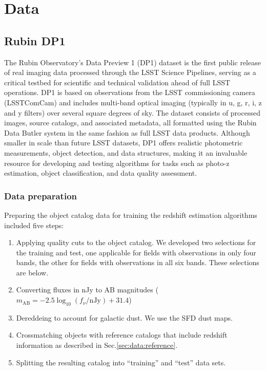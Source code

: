\section{Data}
\label{sec:data:0}

\subsection{Rubin DP1}
\label{sec:data:dp1}

The Rubin Observatory’s Data Preview 1 (DP1) dataset is the first public release of real imaging data processed through the LSST Science Pipelines, serving as a critical testbed for scientific and technical validation ahead of full LSST operations.  DP1 is based on observations from the LSST commissioning camera (LSSTComCam) and includes multi-band optical imaging (typically in u, g, r, i, z and y filters) over several square degrees of sky.  The dataset consists of processed images, source catalogs, and associated metadata, all formatted using the Rubin Data Butler system in the same fashion as full LSST data products.  Although smaller in scale than future LSST datasets, DP1 offers realistic photometric measurements, object detection, and data structures, making it an invaluable resource for developing and testing algorithms for tasks such as photo-z estimation, object classification, and data quality assessment.

\subsubsection{Data preparation}
\label{sec:data:dp1:preparation}

Preparing the object catalog data for training the redshift estimation algorithms included five steps:

\begin{enumerate}
\item{Applying quality cuts to the object catalog.   We developed two selections for the training and test, one applicable for fields with observations in only four bands, the other for fields with observations in all six bands.   These selections are below.}
\item{Converting fluxes in nJy to AB magnitudes ($m_\text{AB} = -2.5 \log_{10}(f_\nu / \text{nJy}) + 31.4$)}
\item{Dereddeing to account for galactic dust.  We use the SFD dust maps\cite{SFD}.}
\item{Crossmatching objects with reference catalogs that include redshift information as described in Sec.\ref{sec:data:reference}.}
\item{Splitting the resulting catalog into ``training'' and ``test'' data sets.}
\end{enumerate}

